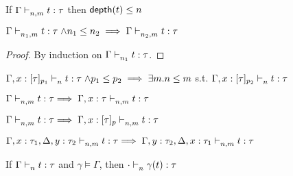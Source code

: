 \begin{lem} 
	\label{lem:2}
	If $\Gamma \mathrel{\vdash_{n,m}^{} {t} : {\tau}} $ then $\mathsf{depth}(t) \leq n$\\
\end{lem}
%
%
%
\begin{lem} 
	\label{lem:deweaken1}
	$\Gamma \mathrel{\vdash_{n_1,m}^{} {t} : {\tau}} \land n_1 \leq n_2 \implies \Gamma \mathrel{\vdash_{n_2,m}^{} {t} : {\tau}}$\\
\end{lem}
\begin{proof}
  By induction on $\Gamma \mathrel{\vdash_{n_1}^{} {t} : {\tau}}  $.
\end{proof}

\begin{lem} 
	\label{lem:deweaken2}
	$\Gamma, x:[\tau]_{p_1} \mathrel{\vdash_{n}^{} {t} : {\tau}} \land p_1 \leq p_2 \implies \exists m. n \leq m$ s.t. $\Gamma, x:[\tau]_{p_2} \mathrel{\vdash_{n}^{} {t} : {\tau}} $\\
\end{lem}
%
%
%
\begin{lem}
    \label{lem:coweaken1}
    $\Gamma \mathrel{\vdash_{n,m}^{} {t} : {\tau}}  \implies \Gamma, x:\tau \mathrel{\vdash_{n,m}^{} {t} : {\tau}} $\\
\end{lem}

\begin{lem}
    \label{lem:coweaken2}
    $\Gamma \mathrel{\vdash_{n,m}^{} {t} : {\tau}}  \implies \Gamma, x:[\tau]_p \mathrel{\vdash_{n,m}^{} {t} : {\tau}} $\\
\end{lem}



\begin{lem}
    \label{lem:coex}
    $\Gamma, x : \tau_1, \Delta, y : \tau_2 \mathrel{\vdash_{n,m}^{} {t} : {\tau}}  \implies \Gamma, y : \tau_2, \Delta, x : \tau_1 \mathrel{\vdash_{n,m}^{} {t} : {\tau}} $\\
\end{lem}

\begin{lem}
	\label{lem:sub}
	If $\Gamma \mathrel{\vdash_{n}^{} {t} : {\tau}}$ and $\gamma \vDash \Gamma$, then $ \cdot \mathrel{\vdash_{n}^{} {\gamma(t)} : {\tau}} $\\
\end{lem}

